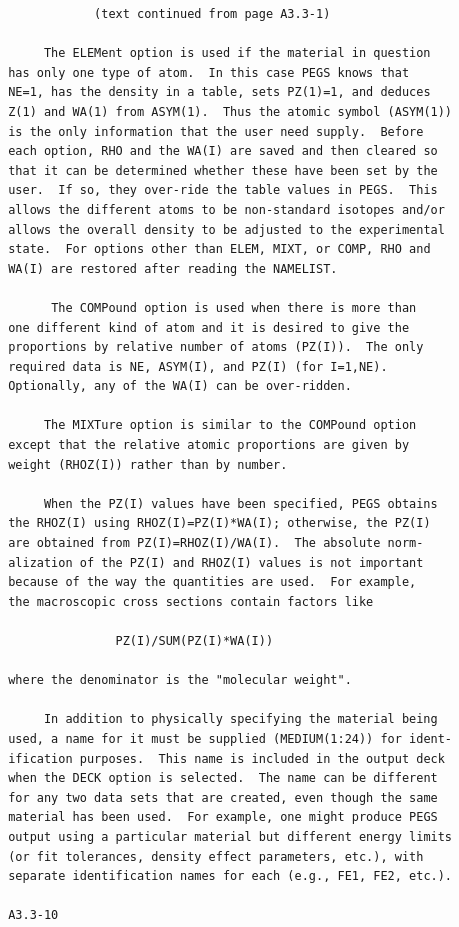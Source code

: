 \newpage {} \begin{verbatim}
             (text continued from page A3.3-1)
 
      The ELEMent option is used if the material in question
 has only one type of atom.  In this case PEGS knows that
 NE=1, has the density in a table, sets PZ(1)=1, and deduces
 Z(1) and WA(1) from ASYM(1).  Thus the atomic symbol (ASYM(1))
 is the only information that the user need supply.  Before
 each option, RHO and the WA(I) are saved and then cleared so
 that it can be determined whether these have been set by the
 user.  If so, they over-ride the table values in PEGS.  This
 allows the different atoms to be non-standard isotopes and/or
 allows the overall density to be adjusted to the experimental
 state.  For options other than ELEM, MIXT, or COMP, RHO and
 WA(I) are restored after reading the NAMELIST.
 
       The COMPound option is used when there is more than
 one different kind of atom and it is desired to give the
 proportions by relative number of atoms (PZ(I)).  The only
 required data is NE, ASYM(I), and PZ(I) (for I=1,NE).
 Optionally, any of the WA(I) can be over-ridden.
 
      The MIXTure option is similar to the COMPound option
 except that the relative atomic proportions are given by
 weight (RHOZ(I)) rather than by number.
 
      When the PZ(I) values have been specified, PEGS obtains
 the RHOZ(I) using RHOZ(I)=PZ(I)*WA(I); otherwise, the PZ(I)
 are obtained from PZ(I)=RHOZ(I)/WA(I).  The absolute norm-
 alization of the PZ(I) and RHOZ(I) values is not important
 because of the way the quantities are used.  For example,
 the macroscopic cross sections contain factors like
 
                PZ(I)/SUM(PZ(I)*WA(I))
 
 where the denominator is the "molecular weight".
 
      In addition to physically specifying the material being
 used, a name for it must be supplied (MEDIUM(1:24)) for ident-
 ification purposes.  This name is included in the output deck
 when the DECK option is selected.  The name can be different
 for any two data sets that are created, even though the same
 material has been used.  For example, one might produce PEGS
 output using a particular material but different energy limits
 (or fit tolerances, density effect parameters, etc.), with
 separate identification names for each (e.g., FE1, FE2, etc.).
 
 A3.3-10
\end{verbatim} 
